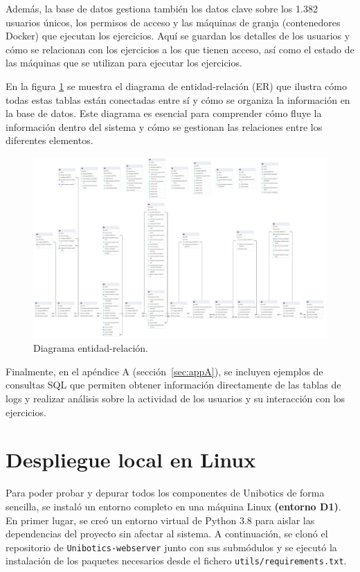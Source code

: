 \documentclass[a4paper, 12pt]{book}
\begin{document}
Además, la base de datos gestiona también los datos clave sobre los 1.382 usuarios únicos, los permisos de acceso y las máquinas de granja (contenedores Docker) que ejecutan los ejercicios. Aquí se guardan los detalles de los usuarios y cómo se relacionan con los ejercicios a los que tienen acceso, así como el estado de las máquinas que se utilizan para ejecutar los ejercicios.

En la figura \ref{fig:ER} se muestra el diagrama de entidad-relación (ER) que ilustra cómo todas estas tablas están conectadas entre sí y cómo se organiza la información en la base de datos. Este diagrama es esencial para comprender cómo fluye la información dentro del sistema y cómo se gestionan las relaciones entre los diferentes elementos.

\begin{landscape}
    \begin{figure}[H]
        \centering
        \includegraphics[height=0.9\textheight, keepaspectratio]{img/ER.png}
        \caption{Diagrama entidad-relación.}
        \label{fig:ER}
    \end{figure}
\end{landscape}

Finalmente, en el apéndice A (sección~\ref{sec:appA}), se incluyen ejemplos de consultas SQL que permiten obtener información directamente de las tablas de logs y realizar análisis sobre la actividad de los usuarios y su interacción con los ejercicios.


\section{Despliegue local en Linux}
\label{subsec:despliegueD1}

Para poder probar y depurar todos los componentes de Unibotics de forma sencilla, se instaló un entorno completo en una máquina Linux \textbf{(entorno D1)}. En primer lugar, se creó un entorno virtual de Python 3.8 para aislar las dependencias del proyecto sin afectar al sistema. A continuación, se clonó el repositorio de \texttt{Unibotics-webserver} junto con sus submódulos y se ejecutó la instalación de los paquetes necesarios desde el fichero \texttt{utils/requirements.txt}.
\end{document}

